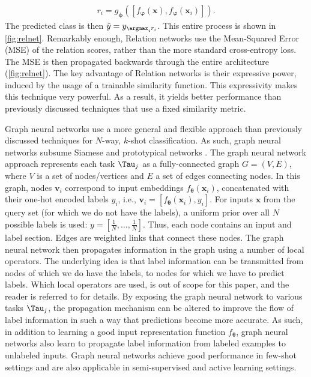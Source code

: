 \begin{align}
    r_{i} = g_{\boldsymbol{\phi}}([f_{\boldsymbol{\varphi}}(\boldsymbol{x}), f_{\boldsymbol{\varphi}}(\boldsymbol{x}_{i}) ]).
\end{align}
The predicted class is then $\hat{y} = y_{\argmax_{i} r_{i}}$. This entire process is shown in \autoref{fig:relnet}. Remarkably enough, Relation networks use the Mean-Squared Error (MSE) of the relation scores, rather than the more standard cross-entropy loss. The MSE is then propagated backwards through the entire architecture (\autoref{fig:relnet}).
The key advantage of Relation networks is their expressive power, induced by the usage of a trainable similarity function. This expressivity makes this technique very powerful. As a result, it yields better performance than previously discussed techniques that use a fixed similarity metric.

\label{sec:graph}
Graph neural networks  use a more general and flexible approach than previously discussed techniques for $N$-way, $k$-shot classification. 
As such, graph neural networks subsume Siamese  and prototypical networks . The graph neural network approach represents each task $\Tau_{j}$ as a fully-connected graph $G = (V,E)$, where $V$ is a set of nodes/vertices and $E$ a set of edges connecting nodes. In this graph, nodes $\boldsymbol{v}_{i}$ correspond to input embeddings $f_{\boldsymbol{\theta}}(\boldsymbol{x}_{i})$, concatenated with their one-hot encoded labels $y_{i}$, i.e., $\boldsymbol{v}_{i} = [f_{\boldsymbol{\theta}}(\boldsymbol{x}_{i}), y_{i}]$. 
For inputs $\boldsymbol{x}$ from the query set (for which we do not have the labels), a uniform prior over all $N$ possible labels is used: $y = [\frac{1}{N}, \ldots ,\frac{1}{N}]$. 
Thus, each node contains an input and label section. Edges are weighted links that connect these nodes.
The graph neural network then propagates information in the graph using a number of local operators. The underlying idea is that label information can be transmitted from nodes of which we do have the labels, to nodes for which we have to predict labels. Which local operators are used, is out of scope for this paper, and the reader is referred to  for details. 
By exposing the graph neural network to various tasks $\Tau_{j}$, the propagation mechanism can be altered to improve the flow of label information in such a way that predictions become more accurate. As such, in addition to learning a good input representation function $f_{\boldsymbol{\theta}}$, graph neural networks also learn to propagate label information from labeled examples to unlabeled inputs.
Graph neural networks achieve good performance in few-shot settings  and are also applicable in semi-supervised and active learning settings.

